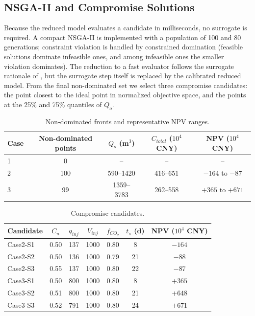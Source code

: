 \subsection{NSGA-II and Compromise Solutions}

Because the reduced model evaluates a candidate in milliseconds, no surrogate
is required. A compact NSGA-II is implemented with a population of 100 and 80
generations; constraint violation is handled by constrained domination
(feasible solutions dominate infeasible ones, and among infeasible ones the
smaller violation dominates). The reduction to a fast evaluator follows the
surrogate rationale of \cite{p3-03}, but the surrogate step itself is replaced
by the calibrated reduced model. From the final non-dominated set we select
three compromise candidates: the point closest to the ideal point in
normalized objective space, and the points at the 25\% and 75\% quantiles of
$Q_o$.

\begin{table}[h!t]
\centering
\caption{Non-dominated fronts and representative NPV ranges.}
\label{tbl:p3_fronts}
\small
\begin{tabular}{lcccc}
\toprule[1.5pt]
Case & Non-dominated points & $Q_o$ (m$^3$) & $C_{total}$ ($10^4$ CNY)
& NPV ($10^4$ CNY)\\
\midrule[1pt]
1 & 0 & -- & -- & --\\
2 & 100 & 590--1420 & 416--651 & $-164$ to $-87$\\
3 & 99 & 1359--3783 & 262--558 & $+365$ to $+671$\\
\bottomrule[1.5pt]
\end{tabular}
\end{table}

\begin{table}[h!t]
\centering
\caption{Compromise candidates.}
\label{tbl:p3_candidates}
\small
\begin{tabular}{lcccccc}
\toprule[1.5pt]
Candidate & $C_n$ & $q_{inj}$ & $V_{inj}$ & $f_{CO_2}$ & $t_s$ (d)
& NPV ($10^4$ CNY)\\
\midrule[1pt]
Case2-S1 & 0.50 & 137 & 1000 & 0.80 & 8 & $-164$\\
Case2-S2 & 0.50 & 136 & 1000 & 0.79 & 21 & $-88$\\
Case2-S3 & 0.55 & 137 & 1000 & 0.80 & 22 & $-87$\\
Case3-S1 & 0.50 & 800 & 1000 & 0.80 & 8 & $+365$\\
Case3-S2 & 0.51 & 800 & 1000 & 0.80 & 21 & $+648$\\
Case3-S3 & 0.52 & 791 & 1000 & 0.80 & 24 & $+671$\\
\bottomrule[1.5pt]
\end{tabular}
\end{table}

